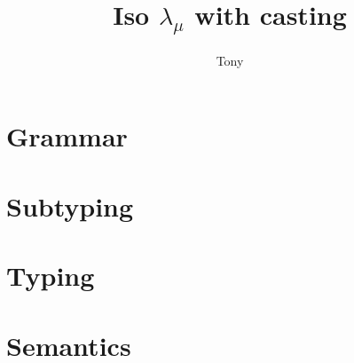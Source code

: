 \documentclass[a4paper]{article}
\title{Iso $\mathsf{\lambda}_{\mu}$ with casting}
\author{Tony}
\begin{document}
\maketitle



\section{Grammar}

\ottgrammar

\section{Subtyping}

\ottdefnsWellFormedTypeEnv


\section{Typing}

\ottdefnsWellFormedTermEnv

\ottdefnsWellFormedType

\ottdefnsTypCast

\ottdefnsTyping



\section{Semantics}

\ottdefnsValues

\ottdefnsDualCast

\ottdefnsReduction
\end{document}
